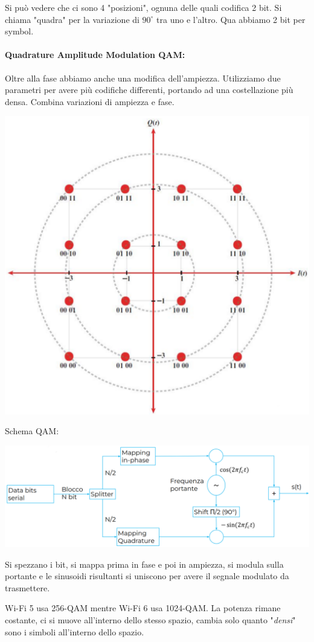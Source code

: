 Si può vedere che ci sono 4 "posizioni", ognuna delle quali codifica 2 bit. Si chiama "quadra" per la variazione di $90^\circ$ tra uno e l'altro. Qua abbiamo 2 bit per symbol.

\paragraph{Quadrature Amplitude Modulation QAM:} Oltre alla fase abbiamo anche una modifica dell'ampiezza. Utilizziamo due parametri per avere più codifiche differenti, portando ad una costellazione più densa. Combina variazioni di ampiezza e fase. 
\begin{center}
	\includegraphics[width=0.6\linewidth]{img/wireless/costellazione2}
\end{center}

Schema QAM:
\begin{center}
	\includegraphics[width=0.9\linewidth]{img/wireless/schemaQAM}
\end{center}

Si spezzano i bit, si mappa prima in fase e poi in ampiezza, si modula sulla portante e le sinusoidi risultanti si uniscono per avere il segnale modulato da trasmettere.


Wi-Fi 5 usa 256-QAM mentre Wi-Fi 6 usa 1024-QAM. La potenza rimane costante, ci si muove all'interno dello stesso spazio, cambia solo quanto "\textit{densi}" sono i simboli all'interno dello spazio.

